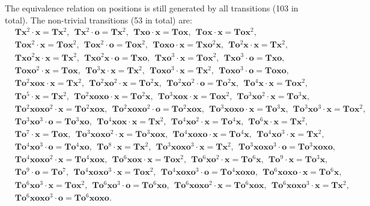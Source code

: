 \documentclass[11pt]{article}
\theoremstyle{definition}
\theoremstyle{plain}
\newcommand{\x}{\mathbf{x}}
\newcommand{\e}{\mathbf{o}}
\newcommand{\m}{\mathbf{T}}
\begin{document}
The equivalence relation on positions is still generated by all transitions (103 in total). The non-trivial transitions (53 in total) are:
\tiny
\begin{align*}
    & \m\x^2\cdot\x=\m\x^2,~~ \m\x^2\cdot\e=\m\x^2,~~ \m\x\e\cdot\x=\m\e\x,~~ \m\e\x\cdot\x=\m\e\x^2,~~ \\
    & \m\e\x^2\cdot\x=\m\e\x^2,~~ \m\e\x^2\cdot\e=\m\e\x^2,~~ \m\e\x\e\cdot\x=\m\x\e^2\x,~~ \m\e^2\x\cdot\x=\m\x^2,~~\\
    & \m\x\e^2\x\cdot\x=\m\x^2,~~ \m\x\e^2\x\cdot\e=\m\x\e,~~ \m\x\e^3\cdot\x=\m\e\x^2,~~ \m\x\e^3\cdot\e=\m\x\e,~~ \\
    & \m\e\x\e^2\cdot\x=\m\e\x,~~ \m\e^3\x\cdot\x=\m\x^2,~~ \m\e\x\e^3\cdot\x=\m\x^2,~~ \m\e\x\e^3\cdot\e=\m\e\x\e,~~ \\
    & \m\e^2\x\e\x\cdot\x=\m\x^2,~~ \m\e^2\x\e^2\cdot\x=\m\e^2\x,~~ \m\e^2\x\e^2\cdot\e=\m\e^2\x,~~ \m\e^4\x\cdot\x=\m\e\x^2,~~ \\
    & \m\e^5\cdot\x=\m\x^2,~~ \m\e^2\x\e\x\e\cdot\x=\m\e^2\x,~~ \m\e^3\x\e\x\cdot\x=\m\e\x^2,~~ \m\e^3\x\e^2\cdot\x=\m\e^3\x,~~ \\
    & \m\e^2\x\e\x\e^2\cdot\x=\m\e^2\x\e\x,~~ \m\e^2\x\e\x\e^2\cdot\e=\m\e^2\x\e\x,~~ \m\e^3\x\e\x\e\cdot\x=\m\e^3\x,~~ \m\e^3\x\e^3\cdot\x=\m\e\x^2,~~ \\
    & \m\e^3\x\e^3\cdot\e=\m\e^3\x\e,~~ \m\e^4\x\e\x\cdot\x=\m\x^2,~~ \m\e^4\x\e^2\cdot\x=\m\e^4\x,~~ \m\e^6\x\cdot\x=\m\x^2,~~ \\
    & \m\e^7\cdot\x=\m\e\x,~~ \m\e^3\x\e\x\e^2\cdot\x=\m\e^3\x\e\x,~~ \m\e^4\x\e\x\e\cdot\x=\m\e^4\x,~~ \m\e^4\x\e^3\cdot\x=\m\x^2,~~\\
    & \m\e^4\x\e^3\cdot\e=\m\e^4\x\e,~~ \m\e^8\cdot\x=\m\x^2,~~ \m\e^3\x\e\x\e^3\cdot\x=\m\x^2,~~ \m\e^3\x\e\x\e^3\cdot\e=\m\e^3\x\e\x\e,~~ \\
    & \m\e^4\x\e\x\e^2\cdot\x=\m\e^4\x\e\x,~~ \m\e^6\x\e\x\cdot\x=\m\e\x^2,~~ \m\e^6\x\e^2\cdot\x=\m\e^6\x,~~ \m\e^9\cdot\x=\m\e^3\x,~~ \\
    & \m\e^9\cdot\e=\m\e^7,~~ \m\e^4\x\e\x\e^3\cdot\x=\m\e\x^2,~~ \m\e^4\x\e\x\e^3\cdot\e=\m\e^4\x\e\x\e,~~ \m\e^6\x\e\x\e\cdot\x=\m\e^6\x,~~ \\
    & \m\e^6\x\e^3\cdot\x=\m\e\x^2,~~ \m\e^6\x\e^3\cdot\e=\m\e^6\x\e,~~ \m\e^6\x\e\x\e^2\cdot\x=\m\e^6\x\e\x,~~ \m\e^6\x\e\x\e^3\cdot\x=\m\x^2,~~ \\
    & \m\e^6\x\e\x\e^3\cdot\e=\m\e^6\x\e\x\e.
\end{align*}\normalsize
\end{document}
